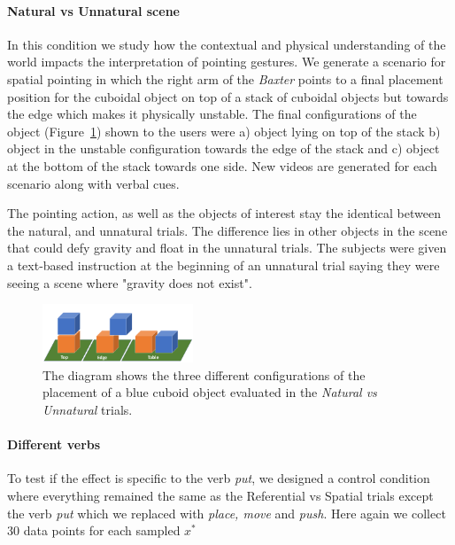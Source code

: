 \paragraph{Natural vs Unnatural scene}
In this condition we study how the contextual and physical understanding of the world impacts the interpretation of pointing gestures. We generate a scenario for spatial pointing in which the right arm of the \textit{Baxter} points to a final placement position for the cuboidal object on top of a stack of cuboidal objects but towards the edge which makes it physically unstable. The final configurations of the object (Figure~\ref{fig:topedgetable}) shown to the users were a) object lying on top of the stack b) object in the unstable configuration towards the edge of the stack and c) object at the bottom of the stack towards one side. New videos are generated for each scenario along with verbal cues.

The pointing action, as well as the objects of interest stay the identical between the natural, and unnatural trials. The difference lies in other objects in the scene that could defy gravity and float in the unnatural trials. The subjects were given a text-based instruction at the beginning of an unnatural trial saying they were seeing a scene where "gravity does not exist". 

\begin{figure}[H]
    \centering
    \includegraphics[width=0.4\textwidth, trim={0 0 0 0.7in},clip ] {figures/topedgetable.png}
    \vspace{-0.1in}
    \caption{
    The diagram shows the three different configurations of the placement of a blue cuboid object evaluated in the \textit{Natural vs Unnatural} trials. 
    }
    \label{fig:topedgetable}
    \vspace{-0.1in}
\end{figure}

\paragraph{Different verbs}  
To test if the effect is specific to the verb \textit{put}, we designed a control condition where everything remained the same as the Referential vs Spatial trials except the verb \textit{put} which we replaced with \textit{place, move} and \textit{push}. Here again we collect 30 data points for each sampled $x^*$

